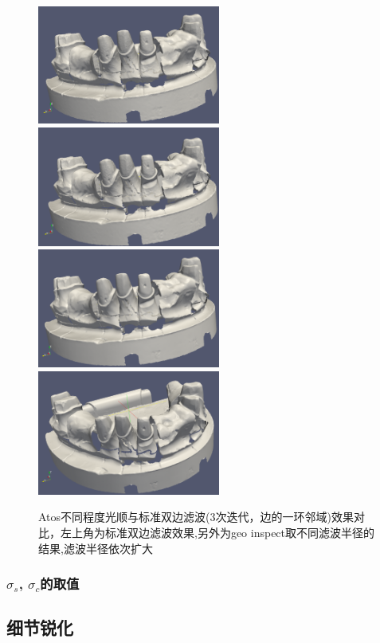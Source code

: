 \documentclass{article}
\theoremstyle{definition}
\theoremstyle{remark}
\begin{document}
\begin{figure}[H]
	\onecolumn
	\includegraphics[width=6cm]{our_basic1}
	\includegraphics[width=6cm]{smooth1_0}
	\includegraphics[width=6cm]{smooth1_1}
	\includegraphics[width=6cm]{smooth1_2}
	\caption[效果对比]
	{Atos不同程度光顺与标准双边滤波(3次迭代，边的一环邻域)效果对比，左上角为标准双边滤波效果,另外为geo inspect取不同滤波半径的结果,滤波半径依次扩大}
	\centering
\end{figure}

\subsubsection{$\sigma_s$, $\sigma_c$的取值}
\subsection{细节锐化}
\end{document}
